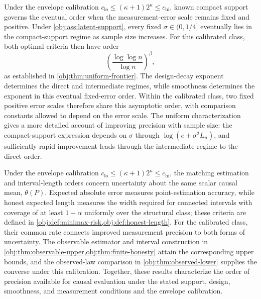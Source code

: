 Under the envelope calibration \(c_{\mathrm{lo}}\le(\kappa+1)2^\kappa\le c_{\mathrm{hi}}\), known compact support governs the eventual order when the measurement-error scale remains fixed and positive. Under \cref{obj:ass:latent-support}, every fixed \(\sigma\in(0,1/4]\) eventually lies in the compact-support regime as sample size increases. For this calibrated class, both optimal criteria then have order
\[
\left(\frac{\log\log n}{\log n}\right)^\beta,
\]
as established in \cref{obj:thm:uniform-frontier}. The design-decay exponent determines the direct and intermediate regimes, while smoothness determines the exponent in this eventual fixed-error order. Within the calibrated class, two fixed positive error scales therefore share this asymptotic order, with comparison constants allowed to depend on the error scale. The uniform characterization gives a more detailed account of improving precision with sample size: the compact-support expression depends on \(\sigma\) through \(\log(e+\sigma^2L_n)\), and sufficiently rapid improvement leads through the intermediate regime to the direct order.

Under the envelope calibration \(c_{\mathrm{lo}}\le(\kappa+1)2^\kappa\le c_{\mathrm{hi}}\), the matching estimation and interval-length orders concern uncertainty about the same scalar causal mean, \(\theta(P)\). Expected absolute error measures point-estimation accuracy, while honest expected length measures the width required for connected intervals with coverage of at least \(1-\alpha\) uniformly over the structural class; these criteria are defined in \cref{obj:def:minimax-risk,obj:def:honest-length}. For the calibrated class, their common rate connects improved measurement precision to both forms of uncertainty. The observable estimator and interval construction in \cref{obj:thm:observable-upper,obj:thm:finite-honesty} attain the corresponding upper bounds, and the observed-law comparison in \cref{obj:thm:observed-lower} supplies the converse under this calibration. Together, these results characterize the order of precision available for causal evaluation under the stated support, design, smoothness, and measurement conditions and the envelope calibration.
